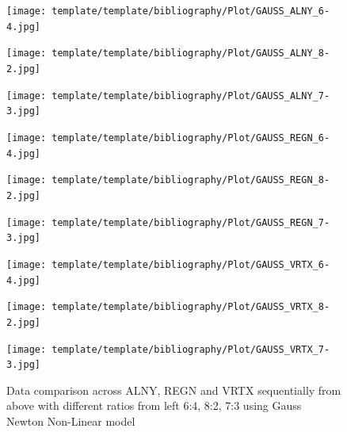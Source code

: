 \documentclass{ieeeojies}
\begin{document}
\begin{enumerate}
\begin{figure}[H]
    \centering
    \begin{minipage}{0.155\textwidth}
    \centering
    \texttt{[image: template/template/bibliography/Plot/GAUSS\_ALNY\_6-4.jpg]}
    \end{minipage}
    \hfill
    \begin{minipage}{0.155\textwidth}
    \centering
    \texttt{[image: template/template/bibliography/Plot/GAUSS\_ALNY\_8-2.jpg]}
    \end{minipage}
    \hfill
    \begin{minipage}{0.155\textwidth}
    \centering
    \texttt{[image: template/template/bibliography/Plot/GAUSS\_ALNY\_7-3.jpg]}
    \end{minipage}
    \hfill
    \begin{minipage}{0.155\textwidth}
    \centering
    \texttt{[image: template/template/bibliography/Plot/GAUSS\_REGN\_6-4.jpg]}
    \end{minipage}
    \hfill
    \begin{minipage}{0.155\textwidth}
    \centering
    \texttt{[image: template/template/bibliography/Plot/GAUSS\_REGN\_8-2.jpg]}
    \end{minipage}
    \hfill
    \begin{minipage}{0.155\textwidth}
    \centering
    \texttt{[image: template/template/bibliography/Plot/GAUSS\_REGN\_7-3.jpg]}
    \end{minipage}
    \hfill
    \begin{minipage}{0.155\textwidth}
    \centering
    \texttt{[image: template/template/bibliography/Plot/GAUSS\_VRTX\_6-4.jpg]}
    \end{minipage}
    \hfill
    \begin{minipage}{0.155\textwidth}
    \centering
    \texttt{[image: template/template/bibliography/Plot/GAUSS\_VRTX\_8-2.jpg]}
    \end{minipage}
    \hfill
    \begin{minipage}{0.155\textwidth}
    \centering
    \texttt{[image: template/template/bibliography/Plot/GAUSS\_VRTX\_7-3.jpg]}
    \end{minipage}
\caption{Data comparison across ALNY, REGN and VRTX sequentially from above with different ratios from left 6:4, 8:2, 7:3 using Gauss Newton Non-Linear model}
\label{fig:combined}
\end{figure}


\end{enumerate}
\end{document}

